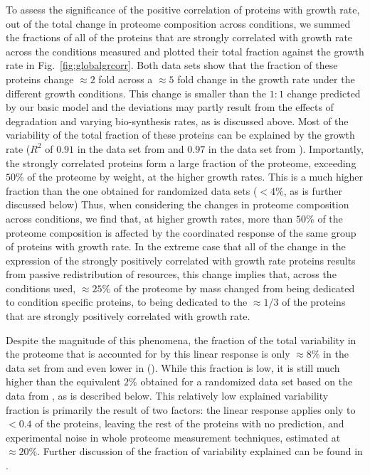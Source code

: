 \documentclass[10pt,letterpaper]{article}
\newcommand{\hGlobalSumRsq}{0.91}
\newcommand{\vnGlobalSumRsq}{0.97}
\newcommand{\vGlobalSumRsq}{\vnGlobalSumRsq{}}
\begin{document}
To assess the significance of the positive correlation of proteins with growth rate, out of the total change in proteome composition across conditions, we summed the fractions of all of the proteins that are strongly correlated with growth rate across the conditions measured and plotted their total fraction against the growth rate in Fig.~\ref{fig:globalgrcorr}.
Both data sets show that the fraction of these proteins change $\approx 2$ fold across a $\approx 5$ fold change in the growth rate under the different growth conditions.
This change is smaller than the $1:1$ change predicted by our basic model and the deviations may partly result from the effects of degradation and varying bio-synthesis rates, as is discussed above.
Most of the variability of the total fraction of these proteins can be explained by the growth rate ($R^2$ of $\hGlobalSumRsq$ in the data set from \cite{Schmidt2015} and $\vGlobalSumRsq$ in the data set from \cite{Peebo_2015}).
Importantly, the strongly correlated proteins form a large fraction of the proteome, exceeding $50\%$ of the proteome by weight, at the higher growth rates.
This is a much higher fraction than the one obtained for randomized data sets ($<4\%$, as is further discussed below)
Thus, when considering the changes in proteome composition across conditions, we find that, at higher growth rates, more than $50\%$ of the proteome composition is affected by the coordinated response of the same group of proteins with growth rate.
In the extreme case that all of the change in the expression of the strongly positively correlated with growth rate proteins results from passive redistribution of resources, this change implies that, across the conditions used, $\approx 25\%$ of the proteome by mass changed from being dedicated to condition specific proteins, to being dedicated to the $\approx 1/3$ of the proteins that are strongly positively correlated with growth rate.

Despite the magnitude of this phenomena, the fraction of the total variability in the proteome that is accounted for by this linear response is only $\approx 8\%$  in the data set from \cite{Schmidt2015} and even lower in \cite{Peebo_2015} ().
While this fraction is low, it is still much higher than the equivalent $2\%$ obtained for a randomized data set based on the data from \cite{Schmidt2015}, as is described below.
This relatively low explained variability fraction is primarily the result of two factors: the linear response applies only to $<0.4$ of the proteins, leaving the rest of the proteins with no prediction, and experimental noise in whole proteome measurement techniques, estimated at $\approx20\%$.
Further discussion of the fraction of variability explained can be found in .
\end{document}
